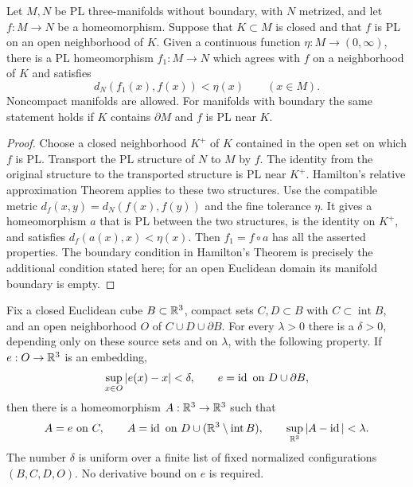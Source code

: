 \begin{lemma}
\label{sm:relative-pl}
Let $M,N$ be PL three-manifolds without boundary, with $N$ metrized,
and let $f:M\to N$ be a homeomorphism.  Suppose that $K\subset M$ is
closed and that $f$ is PL on an open neighborhood of $K$.  Given a
continuous function $\eta:M\to(0,\infty)$, there is a PL
homeomorphism $f_1:M\to N$ which agrees with $f$ on a neighborhood of
$K$ and satisfies
\[
 d_N(f_1(x),f(x))<\eta(x)\qquad(x\in M).
\]
Noncompact manifolds are allowed.  For manifolds with boundary the same
statement holds if $K$ contains $\partial M$ and $f$ is PL near $K$.
\end{lemma}

\begin{proof}
Choose a closed neighborhood $K^+$ of $K$ contained in the open set on
which $f$ is PL.  Transport the PL structure of $N$ to $M$ by $f$.
The identity from the original structure to the transported structure
is PL near $K^+$.  Hamilton's relative approximation Theorem
\cite[Section~3, Theorem~2.2, pp.~68--69]{Hamilton1976} applies to these
two structures.  Use the compatible metric
$d_f(x,y)=d_N(f(x),f(y))$ and the fine tolerance $\eta$.
It gives a homeomorphism $a$ that is PL between the two structures,
is the identity on $K^+$, and satisfies
$d_f(a(x),x)<\eta(x)$.  Then $f_1=f\circ a$ has all the asserted
properties.  The boundary condition in Hamilton's Theorem is precisely
the additional condition stated here; for an open Euclidean domain its
manifold boundary is empty.
\end{proof}

\begin{lemma}
\label{sm:local-extension}
Fix a closed Euclidean cube $B\subset\mathbb R^3$, compact sets $C,D\subset B$
with $C\subset\operatorname{int}B$, and an open neighborhood $O$ of
$C\cup D\cup\partial B$.  For every $\lambda>0$ there is a
$\delta>0$, depending only on these source sets and on $\lambda$,
with the following property.  If $e:O\to\mathbb R^3$ is an embedding,
\[
 \sup_{x\in O}|e(x)-x|<\delta,
 \qquad e=\operatorname{id}\ \hbox{on }D\cup\partial B,
\]
then there is a homeomorphism $A:\mathbb R^3\to\mathbb R^3$ such that
\begin{equation}
 \label{sm:extension-conclusion}
 A=e\ \hbox{on }C,\qquad
 A=\operatorname{id}\ \hbox{on }D\cup(\mathbb R^3\setminus\operatorname{int}B),
 \qquad \sup_{\mathbb R^3}|A-\operatorname{id}|<\lambda.
\end{equation}
The number $\delta$ is uniform over a finite list of fixed normalized
configurations $(B,C,D,O)$.  No derivative bound on $e$ is required.
\end{lemma}

